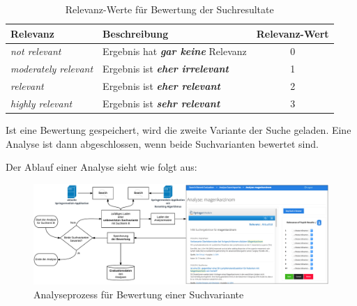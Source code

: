 \begin{table}[H]
\centering
\vspace{-.5em}
\caption[Relevanz-Werte für Bewertung der Suchresultate]{Relevanz-Werte für Bewertung der Suchresultate}
\label{tab:RelevanzWerteBewertungEvaluation}
\vspace{-.5em}
\footnotesize
\renewcommand*{\arraystretch}{1.2}
\begin{tabular}{llc}
\hline
\textbf{Relevanz}            & \textbf{Beschreibung}           & \textbf{Relevanz-Wert} \\ \hline
\textit{not relevant}        & Ergebnis hat \textbf{\textit{gar keine}} Relevanz & 0 \\
\textit{moderately relevant} & Ergebnis ist \textbf{\textit{eher irrelevant}}    & 1 \\
\textit{relevant}            & Ergebnis ist \textbf{\textit{eher relevant}}      & 2 \\
\textit{highly relevant}     & Ergebnis ist \textbf{\textit{sehr relevant}}      & 3 \\ \hline
\end{tabular}
\vspace{-2em}
\end{table}

Ist eine Bewertung gespeichert, wird die zweite Variante der Suche geladen. Eine Analyse ist dann abgeschlossen, wenn beide Suchvarianten bewertet sind. 

\pagebreak 

Der Ablauf einer Analyse sieht wie folgt aus:

\begin{figure}[H]
\centering
\vspace{-.5em}
\caption[Analyseprozess für Bewertung einer Suchvariante]{Analyseprozess für Bewertung einer Suchvariante}
\vspace{.5em}
\label{fig:AnalysemaskeEvaluation}
\includegraphics[width=\linewidth]{gfx/AnalysemaskeEvaluation}
\vspace{-1em}
\end{figure}

